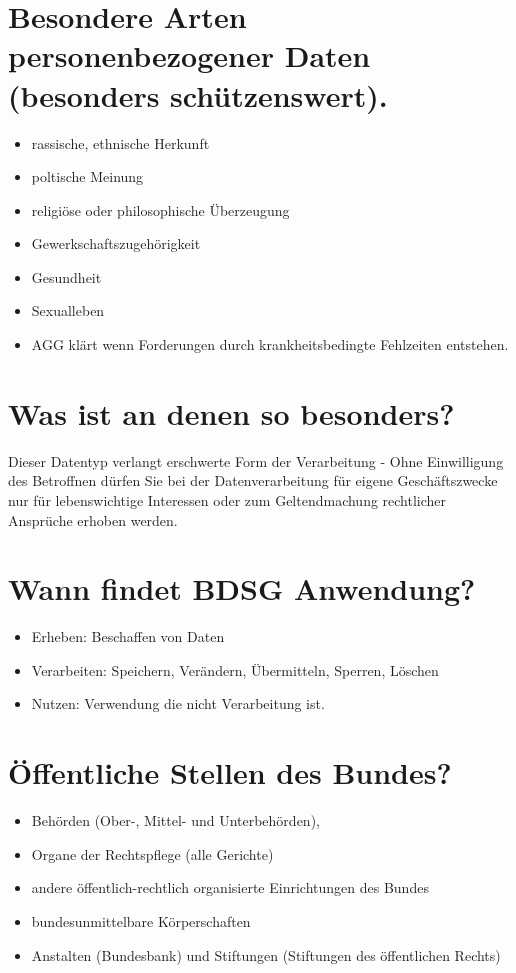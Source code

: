 \documentclass[a4paper,10pt]{scrartcl}
\begin{document}
\section{Besondere Arten personenbezogener Daten (besonders schützenswert).}
\begin{itemize}
 \item rassische, ethnische Herkunft
 \item poltische Meinung
 \item religiöse oder philosophische Überzeugung
 \item Gewerkschaftszugehörigkeit
 \item Gesundheit 
 \item Sexualleben
 
 \item AGG klärt wenn Forderungen durch krankheitsbedingte Fehlzeiten entstehen.
\end{itemize}

\section{Was ist an denen so besonders?}


Dieser Datentyp verlangt erschwerte Form der Verarbeitung - Ohne Einwilligung des
Betroffnen dürfen Sie bei der Datenverarbeitung für eigene Geschäftszwecke nur
für lebenswichtige Interessen oder zum Geltendmachung rechtlicher Ansprüche erhoben
werden.

\section{Wann findet BDSG Anwendung?}

\begin{itemize}
 \item Erheben: Beschaffen von Daten
 \item Verarbeiten: Speichern, Verändern, Übermitteln, Sperren, Löschen
 \item Nutzen: Verwendung die nicht Verarbeitung ist.
\end{itemize}

\section{Öffentliche Stellen des Bundes?}

\begin{itemize}
 \item Behörden (Ober-, Mittel- und Unterbehörden), 
 \item Organe der Rechtspflege (alle Gerichte)
 \item andere öffentlich-rechtlich organisierte Einrichtungen des Bundes
 \item bundesunmittelbare Körperschaften
 \item Anstalten (Bundesbank) und Stiftungen (Stiftungen des öffentlichen Rechts)
 \end{itemize}
\end{document}
